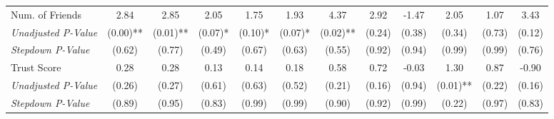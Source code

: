 \begin{tabular}{l c c c c c c c c c c c}
Num. of Friends & 2.84 & 2.85 & 2.05 & 1.75 & 1.93 & 4.37 & 2.92 & -1.47 & 2.05 & 1.07 & 3.43 \\
\quad \textit{Unadjusted P-Value} & (0.00)** & (0.01)** & (0.07)* & (0.10)* & (0.07)* & (0.02)** & (0.24) & (0.38) & (0.34) & (0.73) & (0.12) \\
\quad \textit{Stepdown P-Value} & (0.62) & (0.77) & (0.49) & (0.67) & (0.63) & (0.55) & (0.92) & (0.94) & (0.99) & (0.99) & (0.76) \\
Trust Score & 0.28 & 0.28 & 0.13 & 0.14 & 0.18 & 0.58 & 0.72 & -0.03 & 1.30 & 0.87 & -0.90 \\
\quad \textit{Unadjusted P-Value} & (0.26) & (0.27) & (0.61) & (0.63) & (0.52) & (0.21) & (0.16) & (0.94) & (0.01)** & (0.22) & (0.16) \\
\quad \textit{Stepdown P-Value} & (0.89) & (0.95) & (0.83) & (0.99) & (0.99) & (0.90) & (0.92) & (0.99) & (0.22) & (0.97) & (0.83) \\
\bottomrule
\end{tabular}
